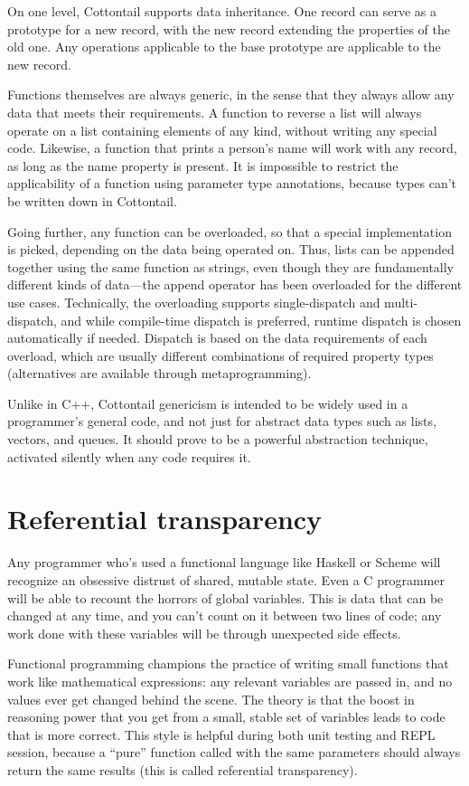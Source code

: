 On one level, Cottontail supports data inheritance. One record
can serve as a prototype for a new record, with the new record
extending the properties of the old one. Any operations applicable
to the base prototype are applicable to the new record.

Functions themselves are always generic, in the sense that they always
allow any data that meets their requirements. A function to reverse a
list will always operate on a list containing elements of any kind,
without writing any special code. Likewise, a function that prints a
person's name will work with any record, as long as the name property
is present. It is impossible to restrict the applicability of a
function using parameter type annotations, because types can't be
written down in Cottontail.

Going further, any function can be overloaded, so that a special
implementation is picked, depending on the data being operated on.
Thus, lists can be appended together using the same function as
strings, even though they are fundamentally different kinds of
data---the append operator has been overloaded for the different use
cases. Technically, the overloading supports single-dispatch and
multi-dispatch, and while compile-time dispatch is preferred, runtime
dispatch is chosen automatically if needed. Dispatch is based on the
data requirements of each overload, which are usually different
combinations of required property types (alternatives are available
through metaprogramming).

Unlike in C++, Cottontail genericism is intended to be widely used in
a programmer's general code, and not just for abstract data types such
as lists, vectors, and queues. It should prove to be a powerful
abstraction technique, activated silently when any code requires it.


\section{Referential transparency}

Any programmer who's used a functional language like Haskell or Scheme
will recognize an obsessive distrust of shared, mutable state. Even a
C programmer will be able to recount the horrors of global variables.
This is data that can be changed at any time, and you can't count on
it between two lines of code; any work done with these variables will
be through unexpected side effects.

Functional programming champions the practice of writing small
functions that work like mathematical expressions: any relevant
variables are passed in, and no values ever get changed behind the
scene. The theory is that the boost in reasoning power that you get
from a small, stable set of variables leads to code that is more
correct. This style is helpful during both unit testing and REPL
session, because a ``pure'' function called with the same parameters
should always return the same results (this is called referential
transparency).

